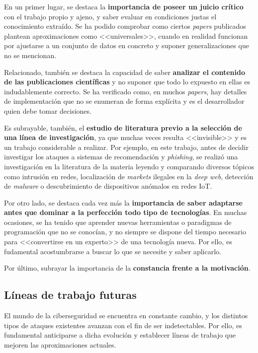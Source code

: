 En un primer lugar, se destaca la \textbf{importancia de poseer un juicio crítico} con el trabajo propio y ajeno, y saber evaluar en condiciones justas el conocimiento extraído. Se ha podido comprobar como ciertos \textit{papers} publicados plantean aproximaciones como <<universales>>, cuando en realidad funcionan por ajustarse a un conjunto de datos en concreto y suponer generalizaciones que no se mencionan.

Relacionado, también se destaca la capacidad de saber \textbf{analizar el contenido de las publicaciones científicas} y no suponer que todo lo expuesto en ellas es indudablemente correcto. Se ha verificado como, en muchos \textit{papers}, hay detalles de implementación que no se enumeran de forma explícita y es el desarrollador quien debe tomar decisiones.

Es subrayable, también, el \textbf{estudio de literatura previo a la selección de una línea de investigación}, ya que muchas veces resulta <<invisible>> y es un trabajo considerable a realizar. Por ejemplo, en este trabajo, antes de decidir investigar los ataques a sistemas de recomendación y \textit{phishing}, se realizó una investigación en la literatura de la materia leyendo y comparando diversos tópicos como intrusión en redes, localización de \textit{markets} ilegales en la \textit{deep web}, detección de \textit{malware} o descubrimiento de dispositivos anómalos en redes IoT.

Por otro lado, se destaca cada vez más la \textbf{importancia de saber adaptarse antes que dominar a la perfección todo tipo de tecnologías}. En muchas ocasiones, se ha tenido que aprender nuevas herramientas o paradigmas de programación que no se conocían, y no siempre se dispone del tiempo necesario para <<convertirse en un experto>> de una tecnología nueva. Por ello, es fudamental acostumbrarse a buscar lo que se necesite y saber aplicarlo.

Por último, subrayar la importancia de la \textbf{constancia frente a la motivación}.


\subsection{Líneas de trabajo futuras}

El mundo de la ciberseguridad se encuentra en constante cambio, y los distintos tipos de ataques existentes avanzan con el fin de ser indetectables. Por ello, es fundamental anticiparse a dicha evolución y establecer líneas de trabajo que mejoren las aproximaciones actuales.

